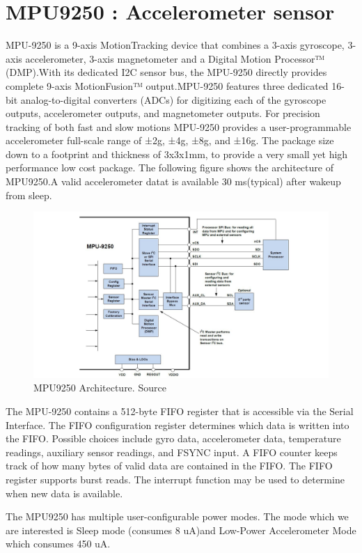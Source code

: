 \section{MPU9250 : Accelerometer sensor}\label{mpu9250_def}
MPU-9250 is a 9-axis MotionTracking device that combines a 3-axis gyroscope, 3-axis accelerometer, 3-axis magnetometer and a Digital Motion Processor™ (DMP).With its dedicated I2C sensor bus, the MPU-9250 directly provides complete 9-axis MotionFusion™ output.MPU-9250 features three dedicated 16-bit analog-to-digital converters (ADCs) for digitizing each of the gyroscope outputs, accelerometer outputs, and magnetometer outputs. For precision tracking of both fast and slow motions MPU-9250 provides a user-programmable accelerometer full-scale range of ±2g, ±4g, ±8g, and ±16g. The package size down to a footprint and thickness of 3x3x1mm, to provide a very small yet high performance low cost package. The following figure shows the architecture of MPU9250.A valid accelerometer datat is available 30 ms(typical) after wakeup from sleep.
\begin{figure}[h]
	\centering
	\includegraphics[scale = 0.5 ]{MPU9250.JPG}
	\caption{MPU9250 Architecture. Source \cite{mpu}\label{mpu9250}}
\end{figure}

The MPU-9250 contains a 512-byte FIFO register that is accessible via the Serial Interface. The FIFO configuration register determines which data is written into the FIFO. Possible choices include gyro data, accelerometer data, temperature readings, auxiliary sensor readings, and FSYNC input. A FIFO counter keeps track of how many bytes of valid data are contained in the FIFO. The FIFO register supports burst reads. The interrupt function may be used to determine when new data is available.

The MPU9250 has multiple user-configurable power modes. The mode which we are interested is Sleep mode (consumes 8 uA)and Low-Power Accelerometer Mode which consumes 450 uA. 
 
